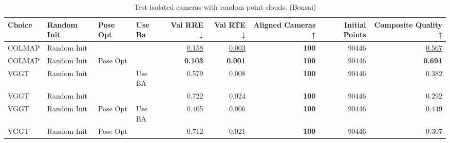 \begin{table}[H]
\caption{Test isolated cameras with random point clouds. (Bonsai)}
\label{tab:06_isolated_cams_bonsai}
\small
\begin{tabular}{llllrrrrr}
\toprule
Choice & Random Init & Pose Opt & Use Ba & Val RRE ↓ & Val RTE ↓ & Aligned Cameras ↑ & Initial Points & Composite Quality ↑ \\
\midrule
COLMAP & Random Init &  &  & \underline{0.158} & \underline{0.003} & \textbf{100} & 90446 & \underline{0.567} \\
COLMAP & Random Init & Pose Opt &  & \textbf{0.103} & \textbf{0.001} & \textbf{100} & 90446 & \textbf{0.691} \\
VGGT & Random Init &  & Use BA & 0.579 & 0.008 & \textbf{100} & 90446 & 0.382 \\
VGGT & Random Init &  &  & 0.722 & 0.024 & \textbf{100} & 90446 & 0.292 \\
VGGT & Random Init & Pose Opt & Use BA & 0.405 & 0.006 & \textbf{100} & 90446 & 0.449 \\
VGGT & Random Init & Pose Opt &  & 0.712 & 0.021 & \textbf{100} & 90446 & 0.307 \\
\bottomrule
\end{tabular}
\end{table}